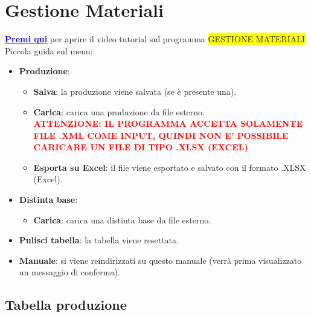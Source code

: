 \documentclass[12pt,twoside]{report}
\newcommand{\coloredbold}[2]{\textcolor{#1}{\textbf{#2}}}
\begin{document}
\chapter{Gestione Materiali}

\href{https://drive.google.com/file/d/1kBvDtx1MlKc4LtRRRGeZtYbrp9oTocNf/view?usp=sharing}{\coloredbold{blue}{Premi qui}} per aprire il video tutorial sul programma \colorbox{yellow}{GESTIONE MATERIALI}\\

Piccola guida sul menu:
\begin{itemize}

	\item \textbf{Produzione}:
	
	\begin{itemize}
		\item \textbf{Salva}: la produzione viene salvata (se è presente una).
		\item \textbf{Carica}: carica una produzione da file esterno.\\
		\coloredbold{red}{ATTENZIONE: IL PROGRAMMA ACCETTA SOLAMENTE FILE .XML COME INPUT, QUINDI NON E' POSSIBILE CARICARE UN FILE DI TIPO .XLSX (EXCEL)}
		\item \textbf{Esporta su Excel}: il file viene esportato e salvato con il formato .XLSX (Excel).
	\end{itemize}

	\item \textbf{Distinta base}:
	
	\begin{itemize}
		\item \textbf{Carica}: carica una distinta base da file esterno.
	\end{itemize}

	\item \textbf{Pulisci tabella}: la tabella viene resettata.
	\item \textbf{Manuale}: si viene reindirizzati su questo manuale (verrà prima visualizzato un messaggio di conferma).

\end{itemize}


\section{Tabella produzione}
\end{document}
